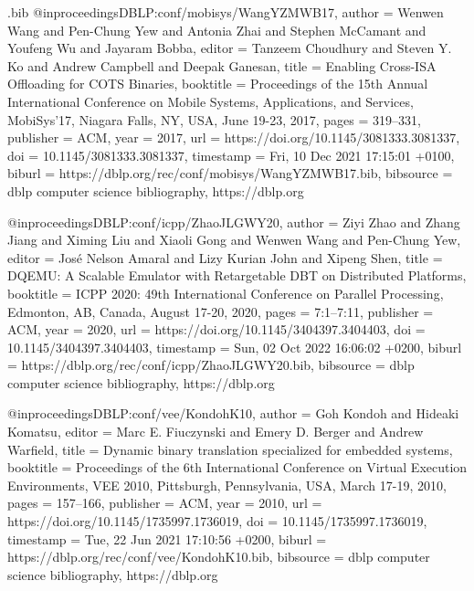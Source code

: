 \begin{filecontents}{\jobname.bib}
@inproceedings{DBLP:conf/mobisys/WangYZMWB17,
  author       = {Wenwen Wang and
                  Pen{-}Chung Yew and
                  Antonia Zhai and
                  Stephen McCamant and
                  Youfeng Wu and
                  Jayaram Bobba},
  editor       = {Tanzeem Choudhury and
                  Steven Y. Ko and
                  Andrew Campbell and
                  Deepak Ganesan},
  title        = {Enabling Cross-ISA Offloading for {COTS} Binaries},
  booktitle    = {Proceedings of the 15th Annual International Conference on Mobile
                  Systems, Applications, and Services, MobiSys'17, Niagara Falls, NY,
                  USA, June 19-23, 2017},
  pages        = {319--331},
  publisher    = {{ACM}},
  year         = {2017},
  url          = {https://doi.org/10.1145/3081333.3081337},
  doi          = {10.1145/3081333.3081337},
  timestamp    = {Fri, 10 Dec 2021 17:15:01 +0100},
  biburl       = {https://dblp.org/rec/conf/mobisys/WangYZMWB17.bib},
  bibsource    = {dblp computer science bibliography, https://dblp.org}
}

@inproceedings{DBLP:conf/icpp/ZhaoJLGWY20,
  author       = {Ziyi Zhao and
                  Zhang Jiang and
                  Ximing Liu and
                  Xiaoli Gong and
                  Wenwen Wang and
                  Pen{-}Chung Yew},
  editor       = {Jos{\'{e}} Nelson Amaral and
                  Lizy Kurian John and
                  Xipeng Shen},
  title        = {{DQEMU:} {A} Scalable Emulator with Retargetable {DBT} on Distributed
                  Platforms},
  booktitle    = {{ICPP} 2020: 49th International Conference on Parallel Processing,
                  Edmonton, AB, Canada, August 17-20, 2020},
  pages        = {7:1--7:11},
  publisher    = {{ACM}},
  year         = {2020},
  url          = {https://doi.org/10.1145/3404397.3404403},
  doi          = {10.1145/3404397.3404403},
  timestamp    = {Sun, 02 Oct 2022 16:06:02 +0200},
  biburl       = {https://dblp.org/rec/conf/icpp/ZhaoJLGWY20.bib},
  bibsource    = {dblp computer science bibliography, https://dblp.org}
}

@inproceedings{DBLP:conf/vee/KondohK10,
  author       = {Goh Kondoh and
                  Hideaki Komatsu},
  editor       = {Marc E. Fiuczynski and
                  Emery D. Berger and
                  Andrew Warfield},
  title        = {Dynamic binary translation specialized for embedded systems},
  booktitle    = {Proceedings of the 6th International Conference on Virtual Execution
                  Environments, {VEE} 2010, Pittsburgh, Pennsylvania, USA, March 17-19,
                  2010},
  pages        = {157--166},
  publisher    = {{ACM}},
  year         = {2010},
  url          = {https://doi.org/10.1145/1735997.1736019},
  doi          = {10.1145/1735997.1736019},
  timestamp    = {Tue, 22 Jun 2021 17:10:56 +0200},
  biburl       = {https://dblp.org/rec/conf/vee/KondohK10.bib},
  bibsource    = {dblp computer science bibliography, https://dblp.org}
}


\end{filecontents}

